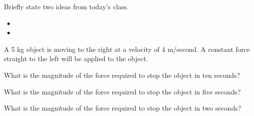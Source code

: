 \postClass

\begin{problem}
\item Briefly state two ideas from today's class.
  \begin{itemize}
  \item 
  \item 
  \end{itemize}
\item 
  \begin{subproblem}
    \item
  \end{subproblem}
\end{problem}



\begin{problem}
\item A 5 kg object is moving to the right at a velocity of 4
  m/second. A constant force straight to the left will be applied to
  the object.
  \begin{subproblem}
  \item What is the magnitude of the force required to stop the object
    in ten seconds?
    \vfill
  \item What is the magnitude of the force required to stop the object
    in five seconds?
    \vfill
  \item What is the magnitude of the force required to stop the object
    in two seconds?
    \vfill
  \end{subproblem}
\end{problem}



